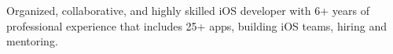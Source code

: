 

\begin{cventries}

Organized, collaborative, and highly skilled iOS developer with 6+ years of professional experience that includes 25+ apps, building iOS teams, hiring and mentoring.

\end{cventries}